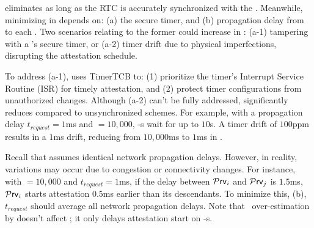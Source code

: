 \noindent {\bf $\boldsymbol{\toctousa}$ \& $\boldsymbol{\toctoura}$:}
\trapsrtc eliminates \toctousa as long as the RTC is accurately synchronized with the \vrf. Meanwhile, minimizing \toctousa in \trapsnortc depends on: (a) the secure timer, and (b) propagation delay from \vrf to each \prv. Two scenarios relating to the former could increase \toctousa in \trapsnortc: (a-1) \sadv tampering with a \prv's secure timer, or (a-2) timer drift due to physical imperfections, disrupting the attestation schedule.

To address (a-1), \trapsnortc uses TimerTCB to: (1) prioritize the timer's Interrupt Service Routine (ISR) for timely attestation, and (2) protect timer configurations from unauthorized changes. Although (a-2) can't be fully addressed, \trapsnortc significantly reduces \toctousa compared to unsynchronized schemes. For example, with a propagation delay $t_{request}=1$ms and \netheight$=10,000$, \prv-s wait for up to $10$s. A timer drift of $100$ppm results in a $1$ms drift, reducing \toctousa from $10,000$ms to $1$ms in \trapsnortc.

 Recall that \trapsnortc assumes identical network propagation delays. However, in reality, variations may occur due to congestion or connectivity changes. For instance, with \netheight$=10,000$ and $t_{request}=1$ms, if the delay between ${\sf{\mathcal Prv}}_i$ and ${\sf{\mathcal Prv}}_j$ is $1.5$ms, ${\sf{\mathcal Prv}}_i$ starts attestation $0.5$ms earlier than its descendants. To minimize this, (b), $t_{request}$ should average all network propagation delays. Note that \netheight\ over-estimation by \vrf doesn't affect \toctousa; it only delays attestation start on \prv-s.


